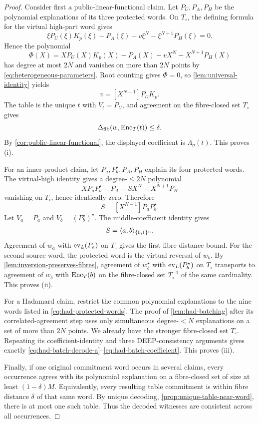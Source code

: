 \begin{proof}
Consider first a public-linear-functional claim.  Let $P_U,P_A,P_H$ be the polynomial explanations of its three protected words.  On $T_\circ$, the defining formula for the virtual high-part word gives
\[
  \xi P_U(\xi)K_p(\xi)
  -P_A(\xi)-v\xi^N-\xi^{N+1}P_H(\xi)=0.
\]
Hence the polynomial
\[
  \Phi(X)=XP_U(X)K_p(X)-P_A(X)-vX^N-X^{N+1}P_H(X)
\]
has degree at most $2N$ and vanishes on more than $2N$ points by \eqref{eq:heterogeneous-parameters}.  Root counting gives $\Phi=0$, so \cref{lem:universal-identity} yields
\[
  v=[X^{N-1}]P_UK_p.
\]
The table is the unique $t$ with $V_t=P_U$, and agreement on the fibre-closed set $T_\circ$ gives
\[
  \Delta_{\mathrm{fib}}(w,\operatorname{Enc}_T(t))\le\delta.
\]
By \cref{cor:public-linear-functional}, the displayed coefficient is $\Lambda_p(t)$.  This proves (i).

For an inner-product claim, let $P_a,P_b^{\star},P_A,P_H$ explain its four protected words.  The virtual-high identity gives a degree-$\le2N$ polynomial
\[
  XP_aP_b^{\star}-P_A-SX^N-X^{N+1}P_H
\]
vanishing on $T_\circ$, hence identically zero.  Therefore
\[
  S=[X^{N-1}]P_aP_b^{\star}.
\]
Let $V_a=P_a$ and $V_b=(P_b^{\star})^{\star}$.  The middle-coefficient identity gives
\[
  S=\langle a,b\rangle_{\{0,1\}^n}.
\]
Agreement of $w_a$ with $\operatorname{ev}_L(P_a)$ on $T_\circ$ gives the first fibre-distance bound.  For the second source word, the protected word is the virtual reversal of $w_b$.  By \cref{lem:inversion-preserves-fibres}, agreement of $w_b^{\star}$ with $\operatorname{ev}_L(P_b^{\star})$ on $T_\circ$ transports to agreement of $w_b$ with $\operatorname{Enc}_T(b)$ on the fibre-closed set $T_\circ^{-1}$ of the same cardinality.  This proves (ii).

For a Hadamard claim, restrict the common polynomial explanations to the nine words listed in \eqref{eq:had-protected-words}.  The proof of \cref{lem:had-batching} after its correlated-agreement step uses only simultaneous degree-$<N$ explanations on a set of more than $2N$ points.  We already have the stronger fibre-closed set $T_\circ$.  Repeating its coefficient-identity and three DEEP-consistency arguments gives exactly \eqref{eq:had-batch-decode-a}--\eqref{eq:had-batch-coefficient}.  This proves (iii).

Finally, if one original commitment word occurs in several claims, every occurrence agrees with its polynomial explanation on a fibre-closed set of size at least $(1-\delta)M$.  Equivalently, every resulting table commitment is within fibre distance $\delta$ of that same word.  By unique decoding, \cref{prop:unique-table-near-word}, there is at most one such table.  Thus the decoded witnesses are consistent across all occurrences.
\end{proof}

